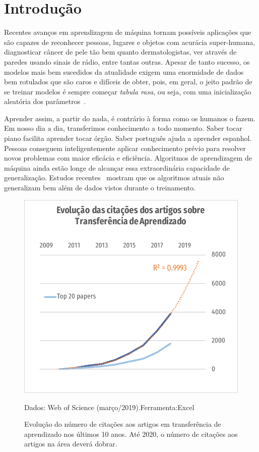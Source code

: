 \documentclass[sigconf]{acmart}
\newcommand{\source}[2]{\raggedleft{}\vspace*{-7mm}\caption*{ \textmd{\scriptsize{Dados: {#1}.\hfill Ferramenta:{#2}}}}}
\begin{document}
\section{Introdução} 
  Recentes avanços em aprendizagem de máquina tornam possíveis aplicações que são capazes de reconhecer pessoas, lugares e objetos com acurácia super-humana\cite{fei}, diagnosticar câncer de pele tão bem quanto dermatologistas\cite{skin_cancer},  ver através de paredes usando sinais de rádio\cite{wifi}, entre tantas outras. Apesar de tanto sucesso, os modelos mais bem sucedidos da atualidade exigem uma enormidade de dados bem rotulados que são caros e difíceis de obter, pois, em geral, o jeito padrão de se treinar modelos é sempre começar \emph{tabula rasa}, ou seja, com uma inicialização aleatória dos parâmetros~\cite{Ruder2019Neural}. 
  
  Aprender assim, a partir do nada, é contrário à forma como os humanos o fazem. Em nosso dia a dia, transferimos conhecimento a todo momento. Saber tocar piano facilita aprender tocar órgão. Saber português ajuda a aprender espanhol. Pessoas conseguem inteligentemente aplicar conhecimento prévio para resolver novos problemas com maior eficácia e eficiência\cite{PanYang}. Algoritmos de aprendizagem de máquina ainda estão longe de alcançar essa extraordinária capacidade de generalização\cite{goodfellow}. Estudos recentes~\cite{DBLP:journals/corr/JiaL17} mostram que os algoritmos atuais não generalizam bem além de dados vistos durante o treinamento. 
  \begin{figure}[h]
    \includegraphics[width=\columnwidth]{citacoes_por_ano}
    \source{Web of Science (março/2019)}{Excel}
    \caption{Evolução do número de citações aos artigos em transferência de aprendizado nos últimos 10 anos. Até 2020, o número de citações aos artigos na área deverá dobrar.}
    \label{fig:citacoes_por_ano}
  \end{figure}
\end{document}

